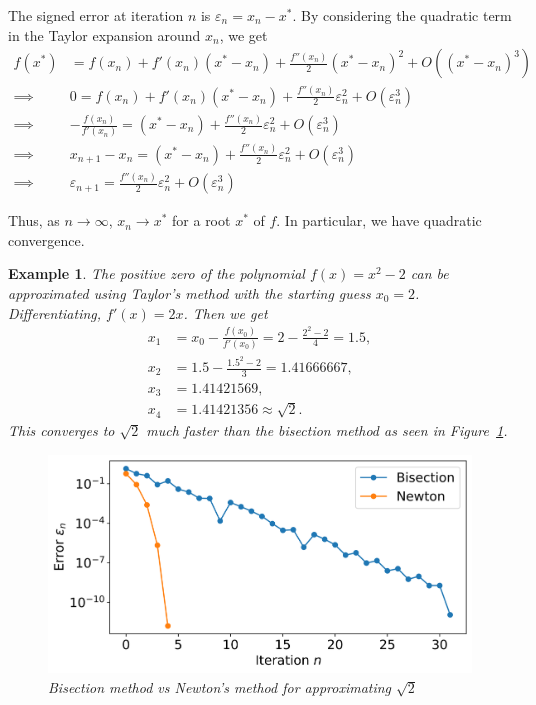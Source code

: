 \documentclass[11pt, a4paper]{article}
\renewcommand{\epsilon}{\varepsilon}
\theoremstyle{break}
\newtheorem{eg}[thm]{Example}
\begin{document}
The signed error at iteration $n$ is $\epsilon_n = x_n-x^*$. By considering the quadratic term in the Taylor expansion around $x_n$, we get \begin{align*}f(x^*)&=f(x_n)+f'(x_n)(x^*-x_n)+\frac{f''(x_n)}{2}(x^*-x_n)^2 + O((x^*-x_n)^3)\\
\implies\quad& 0 = f(x_n) + f'(x_n)(x^*-x_n)+\frac{f''(x_n)}{2}\epsilon_n^2 + O(\epsilon_n^3)\\
\implies\quad& -\frac{f(x_n)}{f'(x_n)}=(x^*-x_n)+\frac{f''(x_n)}{2}\epsilon_n^2 + O(\epsilon_n^3)\\
\implies\quad& x_{n+1}-x_n=(x^*-x_n)+\frac{f''(x_n)}{2}\epsilon_n^2 + O(\epsilon_n^3)\\
 \implies\quad&\epsilon_{n+1}=\frac{f''(x_n)}{2}\epsilon_n^2 + O(\epsilon_n^3)
\end{align*}

Thus, as $n\to \infty$, $x_{n}\to x^*$ for a root $x^*$ of $f$. In particular, we have quadratic convergence.

\begin{eg}
The positive zero of the polynomial $f(x)=x^2-2$ can be approximated using Taylor's method with the starting guess $x_0=2$. Differentiating, $f'(x)=2x$. Then we get \begin{align*}
x_1 &= x_0 - \frac{f(x_0)}{f'(x_0)} = 2 - \frac{2^2-2}{4} = 1.5,\\
x_2 &= 1.5 - \frac{1.5^2-2}{3} = 1.41666667,\\
x_3 &= 1.41421569,\\
x_4 &= 1.41421356 \approx\sqrt{2}.
\end{align*}
This converges to $\sqrt{2}$ much faster than the bisection method as seen in Figure~\ref{fig:bisectionVsNewton}.
\begin{figure}\centering
	\includegraphics[width=0.7\linewidth]{figures/bisectionVsNewton}
	\caption{Bisection method vs Newton's method for approximating $\sqrt2$}\label{fig:bisectionVsNewton}
\end{figure}
\end{eg}
\end{document}
